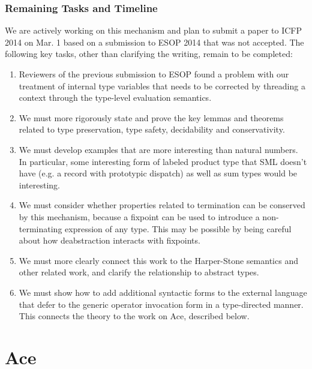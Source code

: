\subsubsection{Remaining Tasks and Timeline}
We are actively working on this mechanism and plan to submit a paper to ICFP 2014 on Mar. 1 based on a submission to ESOP 2014 that was not accepted. The following key tasks, other than clarifying the writing, remain to be completed:

\begin{enumerate}
\item Reviewers of the previous submission to ESOP found a problem with our treatment of internal type variables that needs to be corrected by threading a context through the type-level evaluation semantics.
\item We must more rigorously state and prove the key lemmas and theorems related to type preservation, type safety, decidability and conservativity. 
\item We must develop examples that are more interesting than natural numbers. In particular, some interesting form of labeled product type that SML doesn't have (e.g. a record with prototypic dispatch) as well as sum types would be interesting.
\item We must consider whether properties related to termination can be conserved by this mechanism, because a fixpoint can be used to introduce a non-terminating expression of any type. This may be possible by being careful about how deabstraction interacts with fixpoints.
\item We must more clearly connect this work to the Harper-Stone semantics and other related work, and clarify  the relationship to abstract types.
\item We must show how to add additional syntactic forms to the external language that defer to the generic operator invocation form in a type-directed manner. This connects the theory to the work on Ace, described below. 
\end{enumerate}

\section{Ace}\label{ace}

